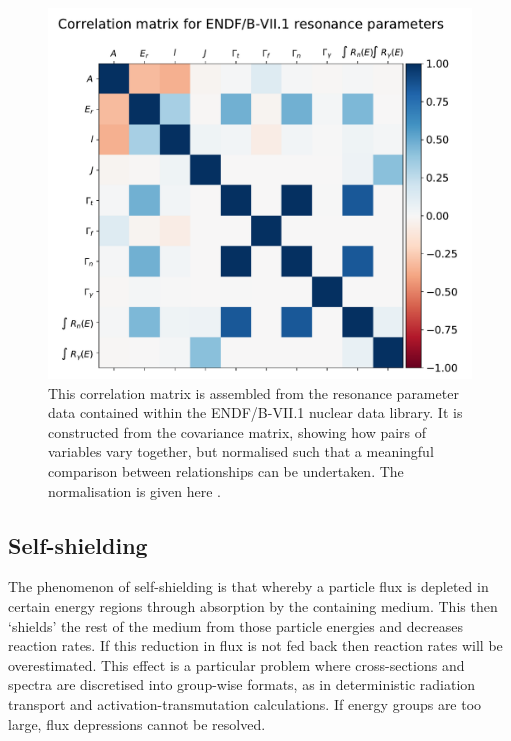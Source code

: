 \begin{figure}[H]
  \centering
  \includegraphics[width=\linewidth]{res_correlation}
  \caption[Correlation matrix of various resonance parameters.]{This correlation matrix is assembled from the resonance parameter data contained within the ENDF/B-VII.1 nuclear data library. It is constructed from the covariance matrix, showing how pairs of variables vary together, but normalised such that a meaningful comparison between relationships can be undertaken. The normalisation is given here \cite{numpy2018}.}
  \label{fig:res_correlation}
\end{figure}



\subsection{Self-shielding}
\label{subsec:self-shielding}
The phenomenon of self-shielding is that whereby a particle flux is depleted in certain energy regions through absorption by the containing medium. This then `shields' the rest of the medium from those particle energies and decreases reaction rates. If this reduction in flux is not fed back then reaction rates will be overestimated. This effect is a particular problem where cross-sections and spectra are discretised into group-wise formats, as in deterministic radiation transport and activation-transmutation calculations. If energy groups are too large, flux depressions cannot be resolved.

